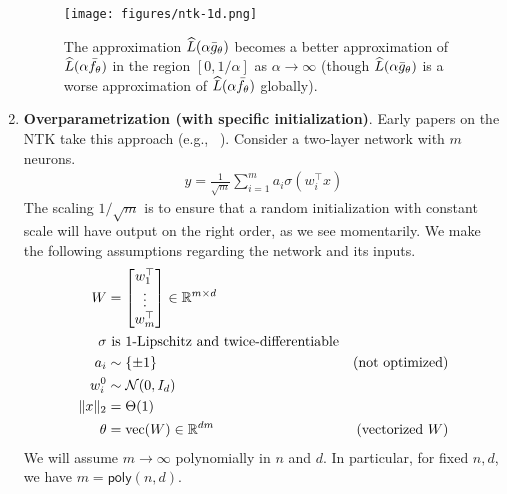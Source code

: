 \begin{enumerate}
\begin{remark}
\begin{figure}[t]
	\centering
	\texttt{[image: figures/ntk-1d.png]}
	\caption{\label{fig:ntk-1d} The approximation $\widehat{L}(\alpha\bar{g}_\theta) $ becomes a better approximation of $\widehat{L}(\alpha\bar{f}_\theta)$ in the region $[0,1/\alpha]$ as $\alpha \rightarrow \infty$ (though $\widehat{L}(\alpha\bar{g}_\theta)$ is a worse approximation of $\widehat{L}(\alpha\bar{f}_\theta)$ globally).}
\end{figure}
%   
\end{remark}
    \item \textbf{Overparametrization (with specific initialization)}. Early papers on the NTK take this approach (e.g., ~\cite{li2018learning,du2019width}). Consider a  two-layer network with $m$ neurons. 
    \begin{align}
        \hat{y} = \frac{1}{\sqrt{m}} \sum_{i=1}^m a_i \sigma(w_i^\top x )
    \end{align} 
    The scaling $1/\sqrt{m}$ is to ensure that a random initialization with constant scale will have output on the right order, as we see momentarily. We make the following assumptions regarding the network and its inputs.
    \begin{align}
        W &= \begin{bmatrix} w_1^\top \\ \vdots \\ w_m^\top \end{bmatrix} \in \mathbb R^{m \times d} \\
        \sigma &\text{ is $1$-Lipschitz and twice-differentiable} \\
        a_i &\sim \{\pm 1\} \quad &\text{(not optimized)} \\
        w_i^0 &\sim \mathcal N(0, I_d) \\
        \|x\|_2 &= \Theta(1) \\
        \theta &= \text{vec}(W) \in \mathbb R^{dm} \quad &\text{(vectorized $W$)}
    \end{align} 
    We will assume $m \to \infty$ polynomially in $n$ and $d$. In particular, for fixed $n,d$, we have $m = \textsf{poly}(n,d)$.
    

\end{enumerate}

